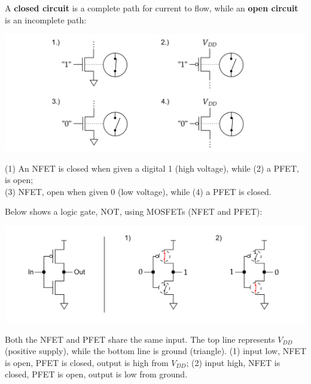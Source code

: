 \noindent
\begin{Def}

  \label{def:open_closed_circuits}

  A \textbf{closed circuit} is a complete path for current to flow, while an \textbf{open circuit} is an incomplete path:

  \begin{center}
  \includegraphics[width=\textwidth]{Sections/circuits/open_closed.png}
  \end{center}

  \noindent
  (1) An NFET is closed when given a digital 1 (high voltage), while (2) a PFET, is open;\\
  (3) NFET, open when given 0 (low voltage), while (4) a PFET is closed.
\end{Def}

\begin{Def}

  \label{def:mosfet_logic_gate_not}

  Below shows a logic gate, NOT, using MOSFETs (NFET and PFET):

  \begin{center}
  \includegraphics[width=\textwidth]{Sections/circuits/not.png}
  \end{center}

  \noindent
  Both the NFET and PFET share the same input. The top line represents $V_{DD}$ (positive supply), while the bottom line is ground (triangle).
  (1) input low, NFET is open, PFET is closed, output is high from $V_{DD}$; (2) input high, NFET is closed, PFET is open, output is low from ground.
\end{Def}

